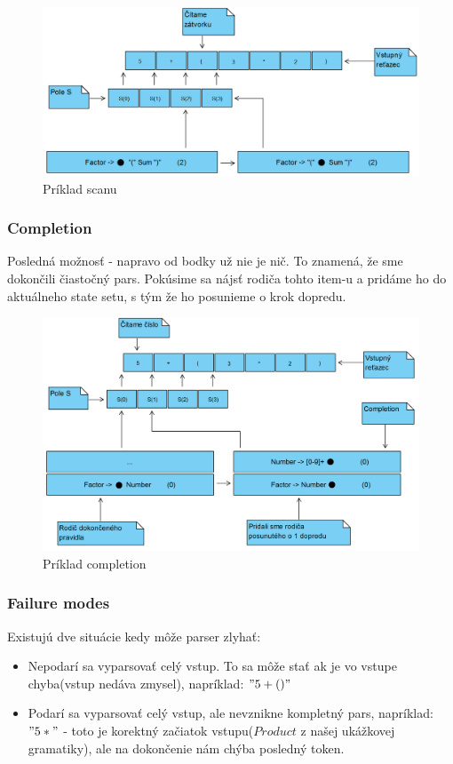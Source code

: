 \documentclass[12pt,a4paper]{report}
\theoremstyle{definition}
\theoremstyle{remark}
\begin{document}
\begin{figure}[h]
\centering
\includegraphics[scale=0.75]{scan}
\caption{Príklad scanu}
\end{figure}

\subsubsection*{Completion}
Posledná možnosť - napravo od bodky už nie je nič. To znamená, že sme dokončili čiastočný pars. Pokúsime sa nájsť rodiča tohto item-u a pridáme ho do aktuálneho state setu, s tým že ho posunieme o krok dopredu.

\begin{figure}[H]
\includegraphics[scale=0.75]{completition}
\caption{Príklad completion}
\end{figure}

\subsubsection*{Failure modes} 
Existujú dve situácie kedy môže parser zlyhať:
\begin{itemize}
\item Nepodarí sa vyparsovať celý vstup. To sa môže stať ak je vo vstupe chyba(vstup nedáva zmysel), napríklad: $"5 + ()"$
\item Podarí sa vyparsovať celý vstup, ale nevznikne kompletný pars, napríklad: $"5 *"$ - toto je korektný začiatok vstupu($Product$ z našej ukážkovej gramatiky), ale na dokončenie nám chýba posledný token.
\end{itemize}
\end{document}
